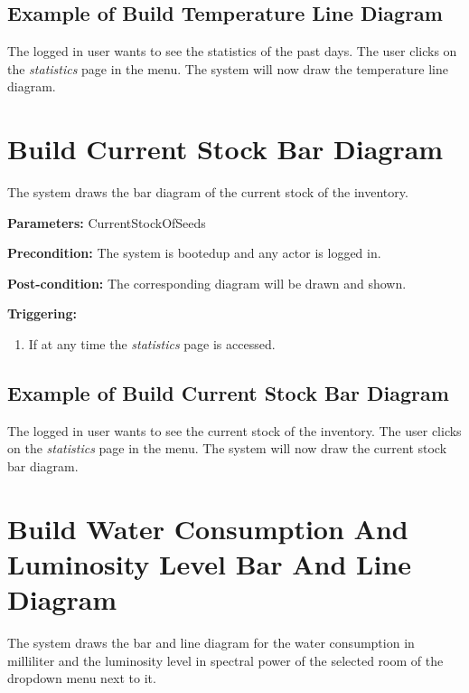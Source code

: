 \subsection{Example of Build Temperature Line Diagram}
The logged in user wants to see the statistics of the past days.
The user clicks on the \emph{statistics} page in the menu.
The system will now draw the temperature line diagram.




\section{Build Current Stock Bar Diagram}
\label{operation:BuildCurrentStockDiagram}
The system draws the bar diagram of the current stock of the inventory.

\begin{description}

\item \textbf{Parameters:} CurrentStockOfSeeds
\item \textbf{Precondition:} The system is bootedup and any actor is logged in.
\item \textbf{Post-condition:} The corresponding diagram will be drawn and
shown.

\item \textbf{Triggering:}
\begin{enumerate}
\item If at any time the \emph{statistics} page is accessed.
\end{enumerate}
\end{description}

\subsection{Example of Build Current Stock Bar Diagram}
The logged in user wants to see the current stock of the inventory.
The user clicks on the \emph{statistics} page in the menu.
The system will now draw the current stock bar diagram.



\break
\section{Build Water Consumption And Luminosity Level Bar And Line Diagram}
\label{operation:BuildWaterConsumptionAndLuminosityLevelDiagram}
The system draws the bar and line diagram for the water consumption in
milliliter and the luminosity level in spectral power of the selected room of
the dropdown menu next to it.


